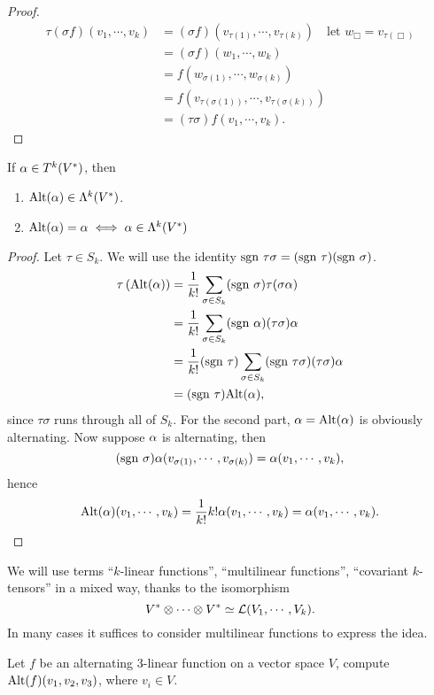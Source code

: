 \begin{proof}
    \begin{align*}
    \tau(\sigma f)(v_1,\cdots,v_k)
    &= (\sigma f)(v_{\tau(1)},\cdots,v_{\tau(k)}) \quad \text{let }w_\Box=v_{\tau(\Box)}\\
    &= (\sigma f)(w_1,\cdots,w_k) \\
    &= f(w_{\sigma(1)},\cdots,w_{\sigma(k)}) \\
    &= f(v_{\tau(\sigma(1))},\cdots,v_{\tau(\sigma(k))}) \\
    &= (\tau \sigma)f(v_1,\cdots,v_k). 
    \end{align*}
\end{proof}
\begin{proposition}
    If $\alpha \in T^k(V^*)$, then 
    \begin{enumerate}
    \item $\mathrm{Alt}(\alpha) \in \Lambda^k(V^*)$.
    \item $\mathrm{Alt}(\alpha) = \alpha \iff \alpha \in \Lambda^k(V^*)$
    \end{enumerate}
\end{proposition}
\begin{proof}
    Let $\tau \in S_k$. We will use the identity $\mathrm{sgn~} \tau \sigma = (\mathrm{sgn~} \tau)(\mathrm{sgn~} \sigma)$. 
    \begin{align*}
    \tau \left(\mathrm{Alt}(\alpha)\right) &= \frac{1}{k!}\sum_{\sigma \in S_k}(\mathrm{sgn~} \sigma)\tau(\sigma \alpha) \\
    &= \frac{1}{k!}\sum_{\sigma \in S_k}(\mathrm{sgn~} \alpha)(\tau \sigma)\alpha \\
    &= \frac{1}{k!}(\mathrm{sgn~} \tau) \sum_{\sigma \in S_k} (\mathrm{sgn~} \tau \sigma)(\tau \sigma)\alpha \\
    &= (\mathrm{sgn~} \tau)\mathrm{Alt}(\alpha),
    \end{align*}
    since $\tau \sigma$ runs through all of $S_k$. For the second part, $\alpha = \mathrm{Alt}(\alpha)$ is obviously alternating. Now suppose $\alpha$ is alternating, then 
    $$(\mathrm{sgn~} \sigma)\alpha(v_{\sigma(1)},\cdots,v_{\sigma(k)}) = \alpha(v_1,\cdots,v_k),$$ hence $$\mathrm{Alt}(\alpha)(v_1,\cdots,v_k) = \frac{1}{k!}k!\alpha(v_1,\cdots,v_k) = \alpha(v_1,\cdots,v_k). $$
\end{proof}
We will use terms ``$k$-linear functions'', ``multilinear functions'', ``covariant $k$-tensors'' in a mixed way, thanks to the isomorphism 
$$V^* \otimes \cdots \otimes V^* \simeq \mathcal{L}(V_1,\cdots,V_k). $$
In many cases it suffices to consider multilinear functions to express the idea. 
\begin{exercise}
    Let $f$ be an alternating $3$-linear function on a vector space $V$, compute $\mathrm{Alt}(f)(v_1,v_2,v_3)$, where $v_i \in V$. 
\end{exercise}
